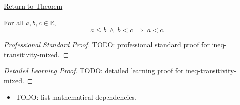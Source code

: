 \newpage
{}
\label{prf:ineq-transitivity-mixed}

\begin{remark*}[Return]
\hyperref[thm:ineq-transitivity-mixed]{Return to Theorem}
\end{remark*}

\begin{theorem*}
For all $a, b, c \in \mathbb{R}$,
\[
  a \le b \;\land\; b < c \;\Rightarrow\; a < c.
\]
\end{theorem*}

\begin{proof}[Professional Standard Proof]
\LRAProofBodyStart
TODO: professional standard proof for ineq-transitivity-mixed.
\end{proof}

\begin{proof}[Detailed Learning Proof]
\LRAProofBodyStart
TODO: detailed learning proof for ineq-transitivity-mixed.
\end{proof}

\begin{remark*}
\end{remark*}

\begin{dependencies}
\begin{itemize}
  \item TODO: list mathematical dependencies.
\end{itemize}
\end{dependencies}

\clearpage
